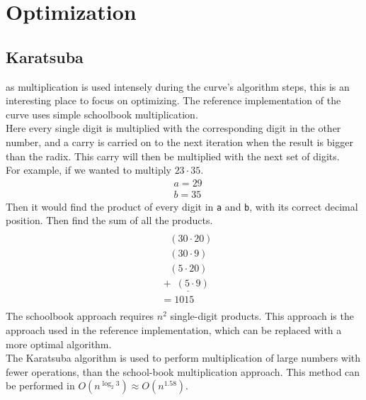 \section{Optimization}

\subsection{Karatsuba}
as multiplication is used intensely during the curve's algorithm steps, this is an interesting place to focus on optimizing. The reference implementation of the curve uses simple schoolbook multiplication.\\
Here every single digit is multiplied with the corresponding digit in the other number, and a carry is carried on to the next iteration when the result is bigger than the radix. This carry will then be multiplied with the next set of digits.\\
For example, if we wanted to multiply $23 \cdot 35$.
\begin{equation*}
    \begin{split}
        & a = 29\\
        & b = 35
    \end{split}
\end{equation*}
Then it would find the product of every digit in \texttt{a} and \texttt{b}, with its correct decimal position. Then find the sum of all the products.
\begin{equation*}
    \begin{split}
        \\
       &\;\;\;\;(30 \cdot 20)\\
       &\;\;\;\;(30 \cdot 9)\\
       &\;\;\;\;(5 \cdot 20)\\
       &\underline{\;+ \; (5 \cdot 9)\;\;\;}\\
       &\; = 1015\\
    \end{split}
\end{equation*}
The schoolbook approach requires $n^{2}$ single-digit products. 
This approach is the approach used in the reference implementation, which can be replaced with a more optimal algorithm.\medskip
\\
\label{karat-opti}The Karatsuba algorithm is used to perform multiplication of large numbers with fewer operations, than the school-book multiplication approach. This method can be performed in $O(n^{\log_{2}3}) \approx O(n^{1.58})$.
